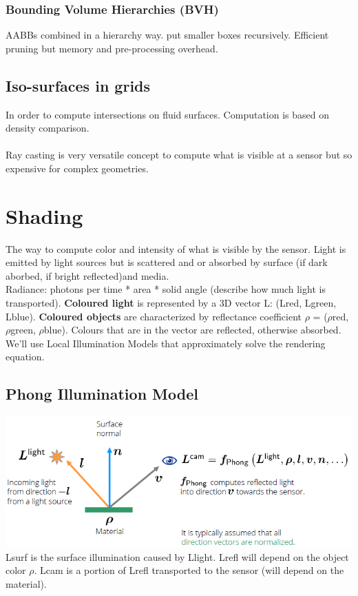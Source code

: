 \documentclass{article}
\begin{document}
\subsubsection{Bounding Volume Hierarchies (BVH)}
AABBs combined in a hierarchy way. put smaller boxes recursively. Efficient pruning but memory and pre-processing overhead.
\subsection{Iso-surfaces in grids}
In order to compute intersections on fluid surfaces. Computation is based on density comparison.\\\\
Ray casting is very versatile concept to compute what is visible at a sensor but so expensive for complex geometries.

\section{Shading}
The way to compute color and intensity of what is visible by the sensor. Light is emitted by light sources but is scattered and or absorbed by surface (if dark aborbed, if bright reflected)and media.\\
Radiance: photons per time * area * solid angle (describe how much light is transported).
\textbf{Coloured light }is represented by a 3D vector L: (Lred, Lgreen, Lblue).
\textbf{Coloured objects }are characterized by reflectance coefficient $\rho$ = ($\rho$red, $\rho$green, $\rho$blue). Colours that are in the vector are reflected, otherwise absorbed.\\
We'll use Local Illumination Models that approximately solve the rendering equation.\\
\subsection{Phong Illumination Model}
\includegraphics{image13.png}\\
Lsurf is the surface illumination caused by Llight. Lrefl will depend on the object color $\rho$. Lcam is a portion of Lrefl transported to the sensor (will depend on the material).
\end{document}
